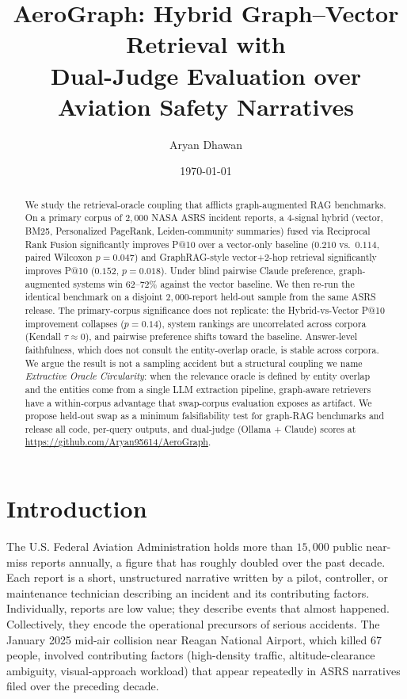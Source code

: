 \documentclass[10pt,a4paper]{article}
\title{\textbf{\large AeroGraph: Hybrid Graph--Vector Retrieval with\\
Dual-Judge Evaluation over Aviation Safety Narratives}}
\author{Aryan Dhawan}
\affil{\small University of Waterloo \quad \texttt{a29dhawa@uwaterloo.ca}}
\date{\small\today}
\begin{document}
\maketitle

\begin{abstract}
\small
We study the retrieval-oracle coupling that afflicts graph-augmented
RAG benchmarks. On a primary corpus of $2{,}000$ NASA ASRS incident
reports, a $4$-signal hybrid (vector, BM25, Personalized PageRank,
Leiden-community summaries) fused via Reciprocal Rank Fusion
significantly improves P@10 over a vector-only baseline
($0.210$ vs.\ $0.114$, paired Wilcoxon $p = 0.047$) and
GraphRAG-style vector+2-hop retrieval significantly improves P@10
($0.152$, $p = 0.018$). Under blind pairwise Claude preference,
graph-augmented systems win $62$--$72\%$ against the vector
baseline. We then re-run the identical benchmark on a disjoint
$2{,}000$-report held-out sample from the same ASRS release. The
primary-corpus significance does not replicate: the Hybrid-vs-Vector
P@10 improvement collapses ($p = 0.14$), system rankings are
uncorrelated across corpora (Kendall $\tau \approx 0$), and pairwise
preference shifts toward the baseline. Answer-level faithfulness,
which does not consult the entity-overlap oracle, is stable across
corpora. We argue the result is not a sampling accident but a
structural coupling we name \emph{Extractive Oracle Circularity}:
when the relevance oracle is defined by entity overlap and the
entities come from a single LLM extraction pipeline, graph-aware
retrievers have a within-corpus advantage that swap-corpus
evaluation exposes as artifact. We propose held-out swap as a
minimum falsifiability test for graph-RAG benchmarks and release
all code, per-query outputs, and dual-judge (Ollama + Claude)
scores at \url{https://github.com/Aryan95614/AeroGraph}.
\end{abstract}

\vspace{0.3ex}

\section{Introduction}
\label{sec:intro}

The U.S. Federal Aviation Administration holds more than $15{,}000$
public near-miss reports annually, a figure that has roughly doubled
over the past decade. Each report is a short, unstructured narrative
written by a pilot, controller, or maintenance technician describing
an incident and its contributing factors. Individually, reports are
low value; they describe events that almost happened. Collectively,
they encode the operational precursors of serious accidents. The
January 2025 mid-air collision near Reagan National Airport, which
killed 67 people, involved contributing factors (high-density traffic,
altitude-clearance ambiguity, visual-approach workload) that appear
repeatedly in ASRS narratives filed over the preceding decade.
\end{document}
